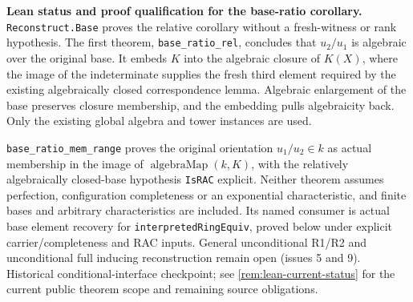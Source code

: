 \documentclass[11pt,oneside]{article}
\theoremstyle{definition}
\theoremstyle{remark}
\newcommand{\lean}[1]{\nolinkurl{#1}}
\begin{document}
\noindent\textbf{Lean status and proof qualification for the base-ratio corollary.}
\lean{Reconstruct.Base} proves the relative corollary without a fresh-witness or rank
hypothesis. The first theorem, \lean{base_ratio_rel}, concludes that $u_2/u_1$ is
algebraic over the original base. It embeds $K$ into the algebraic closure of $K(X)$,
where the image of the indeterminate supplies the fresh third element required by
the existing algebraically closed correspondence lemma. Algebraic enlargement of
the base preserves closure membership, and the embedding pulls algebraicity back.
Only the existing global algebra and tower instances are used.

\lean{base_ratio_mem_range} proves the original orientation $u_1/u_2\in k$ as actual
membership in the image of $\operatorname{algebraMap}(k,K)$, with the relatively
algebraically closed-base hypothesis \lean{IsRAC} explicit. Neither theorem assumes
perfection, configuration completeness or an exponential characteristic, and finite
bases and arbitrary characteristics are included. Its named consumer is actual base
element recovery for \lean{interpretedRingEquiv}, proved below under explicit
carrier/completeness and RAC inputs. General unconditional R1/R2 and
unconditional full inducing reconstruction remain open (issues 5 and 9).
Historical conditional-interface checkpoint; see \cref{rem:lean-current-status} for
the current public theorem scope and remaining source obligations.
\end{document}
